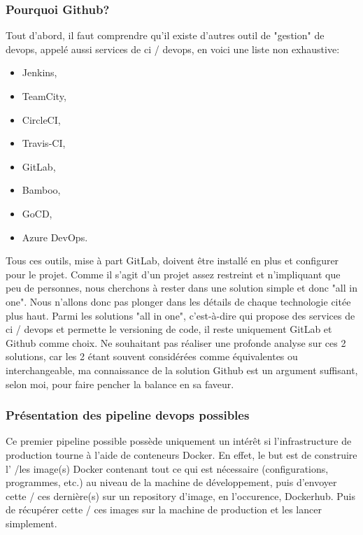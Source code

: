 \documentclass[
    iai, %
    il, %
]{heig-tb}
\begin{document}
\subsubsection{Pourquoi Github?}
Tout d'abord, il faut comprendre qu'il existe d'autres outil de "gestion" de \Gls{devops}, appelé aussi services de \Gls{ci} / \Gls{devops}, en voici une liste non exhaustive:
\begin{itemize}
    \item Jenkins, %
    \item TeamCity, %
    \item CircleCI, %
    \item Travis-CI, %
    \item GitLab, %
    \item Bamboo, %
    \item GoCD, %
    \item Azure DevOps. %
\end{itemize}

Tous ces outils, mise à part GitLab, doivent être installé en plus et configurer pour le projet.
Comme il s'agit d'un projet assez restreint et n'impliquant que peu de personnes, nous cherchons à rester dans une solution simple et donc "all in one".
Nous n'allons donc pas plonger dans les détails de chaque technologie citée plus haut.
Parmi les solutions "all in one", c'est-à-dire qui propose des services de \Gls{ci} / \Gls{devops} et permette le versioning de code, il reste uniquement GitLab et Github comme choix.
Ne souhaitant pas réaliser une profonde analyse sur ces 2 solutions, car les 2 étant souvent considérées comme équivalentes ou interchangeable, ma connaissance de la solution Github est un argument suffisant, selon moi, pour faire pencher la balance en sa faveur.

\subsubsection{Présentation des pipeline \Gls{devops} possibles}
Ce premier pipeline possible possède uniquement un intérêt si l'infrastructure de production tourne à l'aide de conteneurs Docker. En effet, le but est de construire l' /les image(s) Docker contenant tout ce qui est nécessaire (configurations, programmes, etc.) au niveau de la machine de développement, puis d'envoyer cette / ces dernière(s) sur un repository d'image, en l'occurence, Dockerhub. Puis de récupérer cette / ces images sur la machine de production et les lancer simplement.
\end{document}
